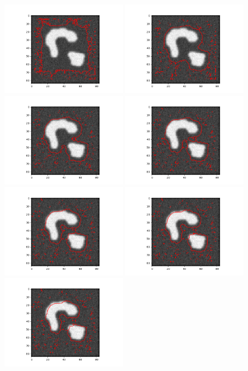 \documentclass[12pt,fleqn]{article}\usepackage{../../common}
\begin{document}
\includegraphics[height=4cm]{level_2_20.png}
\includegraphics[height=4cm]{level_2_40.png}
\includegraphics[height=4cm]{level_2_60.png}
\includegraphics[height=4cm]{level_2_80.png}
\includegraphics[height=4cm]{level_2_100.png}
\includegraphics[height=4cm]{level_2_120.png}
\includegraphics[height=4cm]{level_2_140.png}
\end{document}
